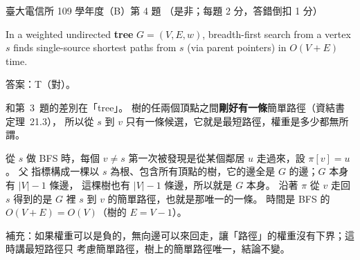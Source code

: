 \begin{pastexam}[label={px:ntu-109-comm-dsa-04}]{臺大電信所 109 學年度（B）第 4 題}
（是非；每題 2 分，答錯倒扣 1 分）

In a weighted undirected \textbf{tree} $G=(V,E,w)$, breadth-first search from a vertex $s$ finds
single-source shortest paths from $s$ (via parent pointers) in $O(V+E)$ time.
\end{pastexam}

\begin{pastsoln}
答案：T（對）。

和第~3~題的差別在「tree」。 樹的任兩個頂點之間\textbf{剛好有一條}簡單路徑（資結書定理~21.3），
所以從 $s$ 到 $v$ 只有一條候選，它就是最短路徑，權重是多少都無所謂。

從 $s$ 做 BFS 時，每個 $v \ne s$ 第一次被發現是從某個鄰居 $u$ 走過來，設 $\pi[v] = u$。 父
指標構成一棵以 $s$ 為根、包含所有頂點的樹，它的邊全是 $G$ 的邊；$G$ 本身有 $|V| - 1$ 條邊，
這棵樹也有 $|V| - 1$ 條邊，所以就是 $G$ 本身。 沿著 $\pi$ 從 $v$ 走回 $s$ 得到的是 $G$ 裡
$s$ 到 $v$ 的簡單路徑，也就是那唯一的一條。 時間是 BFS 的 $O(V + E) = O(V)$（樹的
$E = V - 1$）。

補充：如果權重可以是負的，無向邊可以來回走，讓「路徑」的權重沒有下界；這時講最短路徑只
考慮簡單路徑，樹上的簡單路徑唯一，結論不變。
\end{pastsoln}

